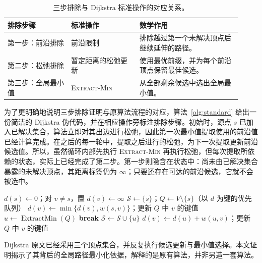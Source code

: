 \documentclass[UTF8,11pt,a4paper]{ctexart}
\begin{document}
\begin{table}[htbp]
\centering
\caption{三步排除与 Dijkstra 标准操作的对应关系。}\label{tab:correspondence}
\small
\begin{tabular}{@{}p{0.25\linewidth}p{0.27\linewidth}p{0.40\linewidth}@{}}
\toprule
排除步骤 & 标准操作 & 数学作用 \\
\midrule
第一步：前沿排除 & 前沿限制 & 排除越过第一个未解决顶点后继续延伸的路径。\\
第二步：松弛排除 & 暂定距离的松弛更新 & 使用最优前缀，并为每个前沿顶点保留最佳候选。\\
第三步：全局最小值 & \textsc{Extract-Min} & 从全部剩余候选中选出全局最小值。\\
\bottomrule
\end{tabular}
\end{table}

为了更明确地说明三步排除证明与原算法流程的对应，算法~\ref{alg:standard} 给出一份简洁的 Dijkstra 伪代码，并在相应操作旁标注排除步骤。初始时，源点 $s$ 已加入已解决集合，算法立即对其出边进行松弛，因此第一次最小值提取使用的前沿值已经计算完成。在之后的每一轮中，提取之后进行的松弛，为下一次提取更新前沿候选值。所以，虽然循环内部先执行 \textsc{Extract-Min} 再执行松弛，但每次提取所依赖的状态，实际上已经完成了第二步。第一步则隐含在状态中：尚未由已解决集合暴露的未解决顶点，其距离标签仍为 $\infty$；只要还存在可达的前沿候选，它就不会被选中。

\begin{algorithm}[htbp]
\caption{以源点作为初始已解决顶点的 Dijkstra 算法}\label{alg:standard}
\begin{algorithmic}[1]
\State $d(s)\gets 0$；对 $v\ne s$，置 $d(v)\gets\infty$
\State $\mathcal S\gets\{s\}$；$Q\gets V\setminus\{s\}$（以 $d$ 为键的优先队列）
  \State $d(v)\gets\min\{d(v),w(s,v)\}$；更新 $Q$ 中 $v$ 的键值 
\EndFor
{}
  \State $u\gets\operatorname{ExtractMin}(Q)$ 
   \State \textbf{break} \EndIf
  \State $\mathcal S\gets\mathcal S\cup\{u\}$
      \State $d(v)\gets d(u)+w(u,v)$；更新 $Q$ 中 $v$ 的键值 
    \EndIf
  \EndFor
\EndWhile
\end{algorithmic}
\end{algorithm}

Dijkstra 原文已经采用三个顶点集合，并反复执行候选更新与最小值选择\cite{Dijkstra1959}。本文证明揭示了其背后的全局路径最小化依据，解释的是原有算法，并非另造一套算法。
\end{document}
